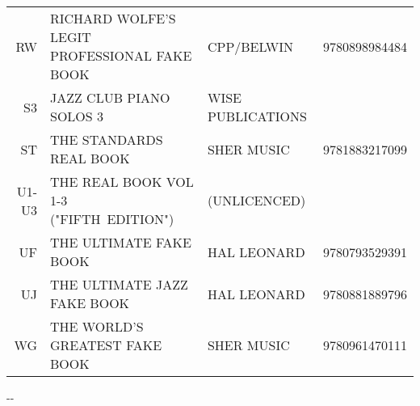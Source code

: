 \documentclass[8pt]{scrartcl}
\begin{document}
\begin{center}
\begin{tabular}{rp{}p{}p{}}
    RW    & RICHARD WOLFE'S LEGIT PROFESSIONAL FAKE BOOK    & CPP/BELWIN        & 9780898984484 \\
    S3    & JAZZ CLUB PIANO SOLOS 3                         & WISE PUBLICATIONS & \\
    ST    & THE STANDARDS REAL BOOK                         & SHER MUSIC        & 9781883217099 \\
    U1-U3 & THE REAL BOOK VOL 1-3 ("FIFTH~EDITION")         & (UNLICENCED)      & \\
    UF    & THE ULTIMATE FAKE BOOK                          & HAL LEONARD       & 9780793529391 \\
    UJ    & THE ULTIMATE JAZZ FAKE BOOK                     & HAL LEONARD       & 9780881889796 \\
    WG    & THE WORLD'S GREATEST FAKE BOOK                  & SHER MUSIC        & 9780961470111 \\


  \end{tabular}
\end{center}

\begin{multicols}{3}
  \raggedright
  
\end{multicols}

\begin{center}
  \the\year-\the\month-\the\day
\end{center}
\end{document}
